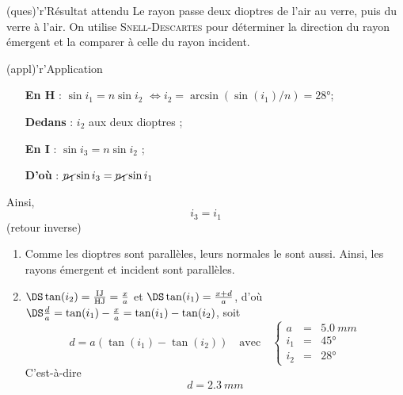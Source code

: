 \documentclass[../../main/main.tex]{subfiles}
\begin{document}
{\begin{tcbraster}[raster columns=11, raster equal height=rows]
\begin{tcolorbox}[blankest, raster multicolumn=5, space to=\myspace]
\begin{tcbraster}[raster columns=1]
\begin{tcb}[add to natural height=\myspace]
				\end{tcb}
			\end{tcbraster}
		\end{tcolorbox}
		\begin{tcolorbox}[blankest, raster multicolumn=6, space to=\myspace]
			\begin{tcbraster}[raster columns=1]
				\begin{tcb}[raster multicolumn=6](ques)'r'{Résultat attendu}
					Le rayon passe deux dioptres de l'air au verre, puis du verre à l'air.
					On utilise \textsc{Snell-Descartes} pour déterminer la direction du
					rayon émergent et la comparer à celle du rayon incident.
				\end{tcb}
				\begin{tcb}[sidebyside, righthand width=1.5cm,
						add to natural height=\myspace](appl)'r'{Application}
					\begin{itemize}[leftmargin=40pt]
						\item[\textbf{En H}] : $\sin i_1 = n\sin i_2$\smallbreak
							\hspace{-40pt}$\Leftrightarrow
								i_2 = \arcsin(\sin(i_1)/n) = \ang{28;;}$;
						\item[\textbf{Dedans}] : $i_2$ aux deux dioptres ;
						\item[\textbf{En I}] : $\sin i_3 = n\sin i_2$ ;
						\item[\textbf{D'où}] :
							$\cancel{n_1}\sin i_3 = \cancel{n_1}\sin i_1$
					\end{itemize}
					\tcblower
					Ainsi,
					\[\boxed{i_3 = i_1}\]
					(retour inverse)
				\end{tcb}
			\end{tcbraster}
		\end{tcolorbox}
	\end{tcbraster}
	\begin{enumerate}[start=3]
		\item Comme les dioptres sont parallèles, leurs normales le sont aussi.
		      Ainsi, les rayons émergent et incident sont parallèles.
		\item $\DS\tan(i_2) = \frac{\rm IJ}{\rm HJ} = \frac{x}{a}$ et $\DS\tan(i_1) =
			      \frac{x+d}{a}$, d'où $\DS\frac{d}{a} = \tan(i_1) - \frac{x}{a} =
			      \tan(i_1) - \tan(i_2)$, soit
		      \[
			      \boxed{d = a(\tan(i_1) - \tan(i_2))}
			      \quad\text{avec}\quad
			      \left\{
			      \begin{array}{rcl}
				      a   & = & \SI{5.0}{mm} \\
				      i_1 & = & \ang{45;;}   \\
				      i_2 & = & \ang{28;;}
			      \end{array}
			      \right.\]
		      C'est-à-dire
		      \[
			      \boxed{d = \SI{2.3}{mm}}
		      \]
	\end{enumerate}
}
\end{document}
